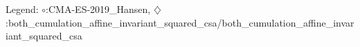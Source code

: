Legend: {\color{CornflowerBlue}$\circ$}:CMA-ES-2019\_Hansen, {\color{Orange}$\diamondsuit$}:both\_cumulation\_affine\_invariant\_squared\_csa/both\_cumulation\_affine\_invariant\_squared\_csa